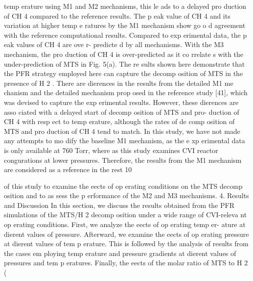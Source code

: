 \documentclass[10pt, letterpaper]{article}
\begin{document}
temp erature using M1 and M2 mechanisms, this le ads to a delayed pro duction of CH
4
compared to the
reference results. The p eak value of CH
4
and its variation at higher temp e ratures by the M1 mechanism
show go o d agreement with the reference computational results. Compared to exp erimental data, the p eak
values of CH
4
are ove r- predicte d by all mechanisms. With the M3 mechanism, the pro duction of CH
4
is
over-predicted as it co rrelate s with the under-prediction of MTS in Fig. 5(a).
The re sults shown here demonstrate that the PFR strategy employed here can capture the decomp osition
of MTS in the presence of H
2
. There are dierences in the results from the detailed M1 me chanism and
the detailed mechanism prop osed in the reference study [41], which was devised to capture the exp erimental
results. However, these dierences are asso ciated with a delayed start of decomp osition of MTS and pro-
duction of CH
4
with resp ect to temp erature, although the rates of de comp osition of MTS and pro duction of
CH
4
tend to match. In this study, we have not made any attempts to mo dify the baseline M1 mechanism, as
the e xp erimental data is only available at 760 Torr, where as this study examines CVI reactor congurations
at lower pressures. Therefore, the results from the M1 mechanism are considered as a reference in the rest
10


of this study to examine the eects of op erating conditions on the MTS decomp osition and to as sess the
p erformance of the M2 and M3 mechanisms.
4. Results and Discussion
In this section, we discuss the results obtained from the PFR simulations of the MTS/H
2
decomp osition
under a wide range of CVI-releva nt op erating conditions. First, we analyze the eects of op erating temp er-
ature at dierent values of pressure. Afterward, we examine the eects of op erating pressure at dierent
values of tem p erature. This is followed by the analysis of results from the cases em ploying temp erature and
pressure gradients at dierent values of pressures and tem p eratures. Finally, the eects of the molar ratio
of MTS to H
2
(
\end{document}
